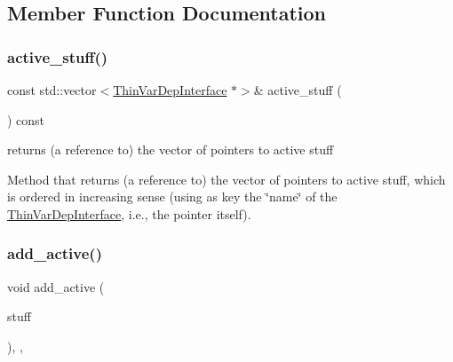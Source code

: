 \subsection{Member Function Documentation}
\mbox{\label{class_s_m_spp__di__unipi__it_1_1_col_variable_a46dadec266320d9c6060d220aaae6b68}} 
\subsubsection{\texorpdfstring{active\+\_\+stuff()}{active\_stuff()}}
{\footnotesize\ttfamily const std\+::vector$<$\mbox{\hyperlink{class_s_m_spp__di__unipi__it_1_1_thin_var_dep_interface}{Thin\+Var\+Dep\+Interface}} $\ast$$>$\& active\+\_\+stuff (\begin{DoxyParamCaption}\item[{void}]{ }\end{DoxyParamCaption}) const\hspace{0.3cm}{\ttfamily [inline]}}



returns (a reference to) the vector of pointers to active stuff 

Method that returns (a reference to) the vector of pointers to active stuff, which is ordered in increasing sense (using as key the \char`\"{}name\char`\"{} of the \mbox{\hyperlink{class_s_m_spp__di__unipi__it_1_1_thin_var_dep_interface}{Thin\+Var\+Dep\+Interface}}, i.\+e., the pointer itself). \mbox{\label{class_s_m_spp__di__unipi__it_1_1_col_variable_a0d6d3734871ae74a4d33fc5604fcd141}} 
\subsubsection{\texorpdfstring{add\+\_\+active()}{add\_active()}}
{\footnotesize\ttfamily void add\+\_\+active (\begin{DoxyParamCaption}\item[{\mbox{\hyperlink{class_s_m_spp__di__unipi__it_1_1_thin_var_dep_interface}{Thin\+Var\+Dep\+Interface}} $\ast$}]{stuff }\end{DoxyParamCaption})\hspace{0.3cm}{\ttfamily [inline]}, {\ttfamily [override]}, {\ttfamily [virtual]}}



